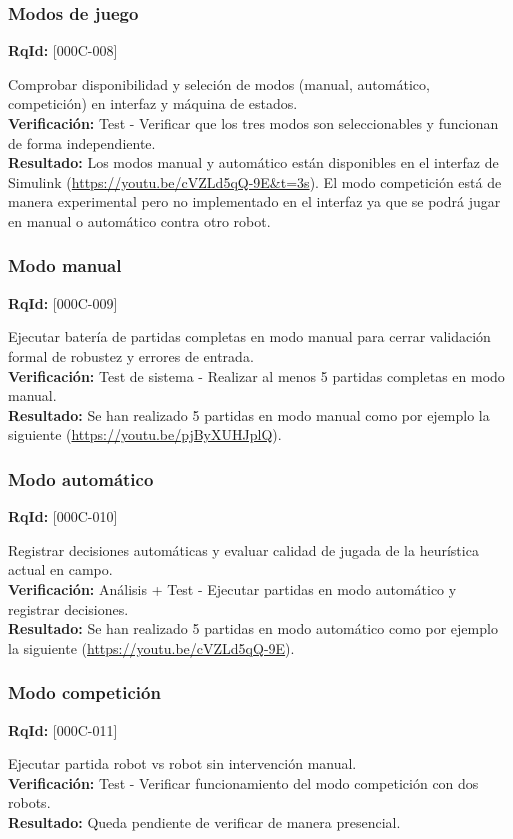 \documentclass[12pt,a4paper]{article}
\begin{document}
\subsubsection{Modos de juego}
\textbf{RqId:} [000C-008]
\vspace{0.3em}
\par Comprobar disponibilidad y seleción de modos (manual, automático, competición) en interfaz y máquina de estados.
\\ \textbf{Verificación:} Test - Verificar que los tres modos son seleccionables y funcionan de forma independiente.
\\ \textbf{Resultado:} Los modos manual y automático están disponibles en el interfaz de Simulink (\url{https://youtu.be/cVZLd5qQ-9E&t=3s}). El modo competición está de manera experimental pero no implementado en el interfaz ya que se podrá jugar en manual o automático contra otro robot.

\subsubsection{Modo manual}
\textbf{RqId:} [000C-009]
\vspace{0.3em}
\par Ejecutar batería de partidas completas en modo manual para cerrar validación formal de robustez y errores de entrada.
\\ \textbf{Verificación:} Test de sistema - Realizar al menos 5 partidas completas en modo manual.
\\ \textbf{Resultado:} Se han realizado 5 partidas en modo manual como por ejemplo la siguiente (\url{https://youtu.be/pjByXUHJplQ}).

\subsubsection{Modo automático}
\textbf{RqId:} [000C-010]
\vspace{0.3em}
\par Registrar decisiones automáticas y evaluar calidad de jugada de la heurística actual en campo.
\\ \textbf{Verificación:} Análisis + Test - Ejecutar partidas en modo automático y registrar decisiones.
\\ \textbf{Resultado:} Se han realizado 5 partidas en modo automático como por ejemplo la siguiente (\url{https://youtu.be/cVZLd5qQ-9E}).


\subsubsection{Modo competición}
\textbf{RqId:} [000C-011]
\vspace{0.3em}
\par Ejecutar partida robot vs robot sin intervención manual.
\\ \textbf{Verificación:} Test - Verificar funcionamiento del modo competición con dos robots.
\\ \textbf{Resultado:} Queda pendiente de verificar de manera presencial.
\end{document}
